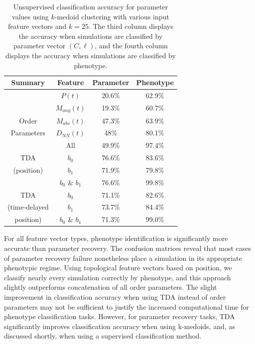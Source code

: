 \documentclass[%
 aip,
reprint,
 amsmath,amssymb,
 aps,
showkeys
]{revtex4-1}
\begin{document}
\begin{table}
     \caption{\label{tab:unsup_results}Unsupervised classification accuracy for parameter values using $k$-medoid clustering with various input feature vectors and $k=25$. The third column displays the accuracy when simulations are classified by parameter vector $(C,\ell)$, and the fourth column displays the accuracy when simulations are classified by phenotype.}
    \begin{tabular}{|c|c|c|c|}
    \hline
    \textbf{Summary} & \textbf{Feature}  & \textbf{Parameter}  & \textbf{Phenotype}  \\ \hline
    \hline
          & $P(t)$ & 20.6\% & 62.9\%\\
          & $M_{ang}(t)$ & 19.3\% & 60.7\%\\
        Order   &  $M_{abs}(t)$ & 47.3\% & 63.9\%\\
         Parameters & $D_{NN}(t)$ & 48\% & 80.1\%\\
          & All & 49.9\% & 97.4\% \\ \hline
          TDA & $b_0$ & 76.6\% & 83.6\% \\
           (position)& $b_1$& 71.9\% & 79.8\%\\
         & $b_0$ \& $b_1$ & 76.6\% & 99.8\%\\ \hline
         TDA & $b_0$ & 71.1\% & 82.6\%\\
          (time-delayed & $b_1$& 73.7\% & 84.4\%\\
          position) & $b_0$ \& $b_1$ & 71.3\% & 99.0\%\\ 
        \hline  
    \end{tabular}
\end{table}

For all feature vector types, phenotype identification is significantly more accurate than parameter recovery. The confusion matrices reveal that most cases of parameter recovery failure nonetheless place a simulation in its appropriate phenotypic regime. Using topological feature vectors based on position, we classify nearly every simulation correctly by phenotype, and this approach slightly outperforms concatenation of all order parameters. The slight improvement in classification accuracy when using TDA instead of order parameters may not be sufficient to justify the increased computational time for phenotype classification tasks. However, for parameter recovery tasks, TDA significantly improves classification accuracy when using k-medoids, and, as discussed shortly, when using a supervised classification method.
\end{document}
